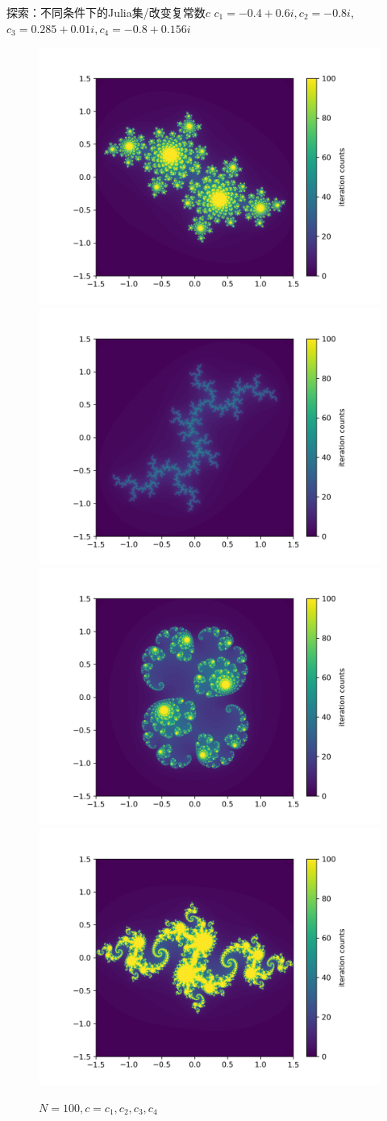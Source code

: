 \documentclass{beamer}
\begin{document}
\begin{frame}{探索：不同条件下的Julia集/改变复常数$c$}
	$c_1=-0.4+0.6i,c_2=-0.8i$,\\$c_3=0.285+0.01i,c_4=-0.8+0.156i$
\begin{figure}[H]
	\includegraphics[width=.35\textwidth]{../png/300dpi/julia_cx-0.4cy0.6_N100.png}
	\includegraphics[width=.35\textwidth]{../png/300dpi/julia_cx0cy-0.8_N100.png}
	\includegraphics[width=.35\textwidth]{../png/300dpi/julia_cx0.285cy0.01_N100.png}
	\includegraphics[width=.35\textwidth]{../png/300dpi/julia_cx-0.8cy0.156_N100.png}
	\caption{$N=100,c=c_1,c_2,c_3,c_4$}
\end{figure}

\end{frame}
\end{document}
